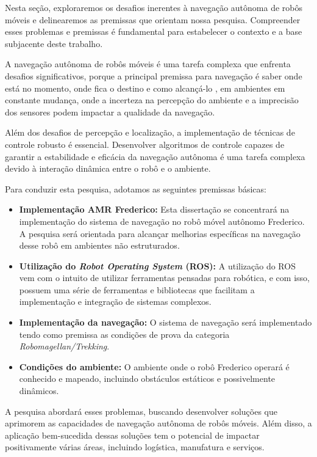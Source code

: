Nesta seção, exploraremos os desafios inerentes à navegação autônoma de robôs móveis e delinearemos as premissas que orientam nossa pesquisa. Compreender esses problemas e premissas é fundamental para estabelecer o contexto e a base subjacente deste trabalho.

A navegação autônoma de robôs móveis é uma tarefa complexa que enfrenta desafios significativos, porque a principal premissa para navegação é saber onde está no momento, onde fica o destino e como alcançá-lo \cite{Alatise2020}, em ambientes em constante mudança, onde a incerteza na percepção do ambiente e a imprecisão dos sensores podem impactar a qualidade da navegação. 

Além dos desafios de percepção e localização, a implementação de técnicas de controle robusto é essencial. Desenvolver algoritmos de controle capazes de garantir a estabilidade e eficácia da navegação autônoma é uma tarefa complexa devido à interação dinâmica entre o robô e o ambiente.

Para conduzir esta pesquisa, adotamos as seguintes premissas básicas:

\begin{itemize}
    \item \textbf{Implementação AMR Frederico:} Esta dissertação se concentrará na implementação do sistema de navegação no robô móvel autônomo Frederico. A pesquisa será orientada para alcançar melhorias específicas na navegação desse robô em ambientes não estruturados.
    \item \textbf{Utilização do \emph{Robot Operating System} (ROS):} A utilização do ROS vem com o intuito de utilizar ferramentas pensadas para robótica, e com isso, possuem uma série de ferramentas e bibliotecas que facilitam a implementação e integração de sistemas complexos. 
    \item \textbf{Implementação da navegação:} O sistema de navegação será implementado tendo como premissa as condições de prova da categoria \textit{Robomagellan/Trekking}.
    \item \textbf{Condições do ambiente:} O ambiente onde o robô Frederico operará é conhecido e mapeado, incluindo obstáculos estáticos e possivelmente dinâmicos.
\end{itemize}

A pesquisa abordará esses problemas, buscando desenvolver soluções que aprimorem as capacidades de navegação autônoma de robôs móveis. Além disso, a aplicação bem-sucedida dessas soluções tem o potencial de impactar positivamente várias áreas, incluindo logística, manufatura e serviços.

